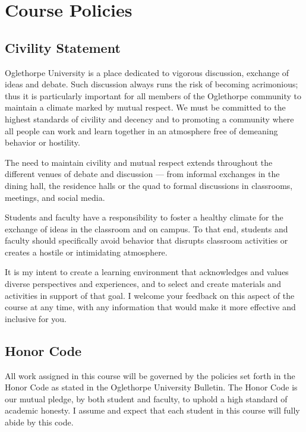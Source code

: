 \documentclass[
]{book}
\begin{document}
\section*{Course Policies}\label{course-policies}

\subsection*{Civility Statement}\label{civility-statement}

Oglethorpe University is a place dedicated to vigorous discussion, exchange of ideas and debate. Such discussion always runs the risk of becoming acrimonious; thus it is particularly important for all members of the Oglethorpe community to maintain a climate marked by mutual respect. We must be committed to the highest standards of civility and decency and to promoting a community where all people can work and learn together in an atmosphere free of demeaning behavior or hostility.

The need to maintain civility and mutual respect extends throughout the different venues of debate and discussion --- from informal exchanges in the dining hall, the residence halls or the quad to formal discussions in classrooms, meetings, and social media.

Students and faculty have a responsibility to foster a healthy climate for the exchange of ideas in the classroom and on campus. To that end, students and faculty should specifically avoid behavior that disrupts classroom activities or creates a hostile or intimidating atmosphere.

It is my intent to create a learning environment that acknowledges and values diverse perspectives and experiences, and to select and create materials and activities in support of that goal. I welcome your feedback on this aspect of the course at any time, with any information that would make it more effective and inclusive for you.

\subsection*{Honor Code}\label{honor-code}

All work assigned in this course will be governed by the policies set forth in the Honor Code as stated in the Oglethorpe University Bulletin. The Honor Code is our mutual pledge, by both student and faculty, to uphold a high standard of academic honesty. I assume and expect that each student in this course will fully abide by this code.
\end{document}
